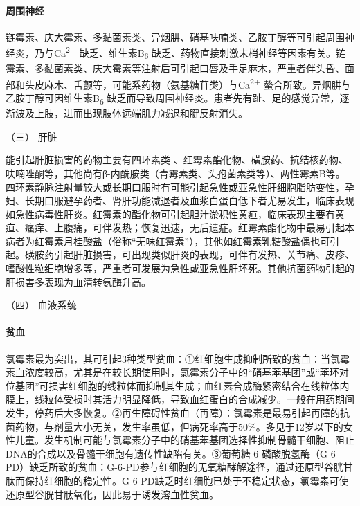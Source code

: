 \paragraph{周围神经}

链霉素、庆大霉素、多黏菌素类、异烟肼、硝基呋喃类、乙胺丁醇等可引起周围神经炎，乃与Ca\textsuperscript{2+}
缺乏、维生素B\textsubscript{6}
缺乏、药物直接刺激末梢神经等因素有关。链霉素、多黏菌素类、庆大霉素等注射后可引起口唇及手足麻木，严重者伴头昏、面部和头皮麻木、舌颤等，可能系药物（氨基糖苷类）与Ca\textsuperscript{2+}
螯合所致。异烟肼与乙胺丁醇可因维生素B\textsubscript{6}
缺乏而导致周围神经炎。患者先有趾、足的感觉异常，逐渐波及上肢，进而出现肢体远端肌力减退和腱反射消失。

\hypertarget{text00436.htmlux5cux23CHP17-7-7-1-3}{}
（三） 肝脏

能引起肝脏损害的药物主要有四环素类
、红霉素酯化物、磺胺药、抗结核药物、呋喃唑酮等，其他尚有β-内酰胺类（青霉素类、头孢菌素类等）、两性霉素B等。四环素静脉注射量较大或长期口服时有可能引起急性或亚急性肝细胞脂肪变性，孕妇、长期口服避孕药者、肾肝功能减退者及血浆白蛋白低下者尤易发生，临床表现如急性病毒性肝炎。红霉素的酯化物可引起胆汁淤积性黄疸，临床表现主要有黄疸、瘙痒、上腹痛，可伴发热；恢复迅速，无后遗症。红霉素酯化物中最易引起本病者为红霉素月桂酸盐（俗称“无味红霉素”），其他如红霉素乳糖酸盐偶也可引起。磺胺药引起肝脏损害，可出现类似肝炎的表现，可伴有发热、关节痛、皮疹、嗜酸性粒细胞增多等，严重者可发展为急性或亚急性肝坏死。其他抗菌药物引起的肝损害多表现为血清转氨酶升高。

\hypertarget{text00436.htmlux5cux23CHP17-7-7-1-4}{}
（四） 血液系统

\paragraph{贫血}

氯霉素最为突出，其可引起3种类型贫血：①红细胞生成抑制所致的贫血：当氯霉素血浓度较高，尤其是在较长期使用时，氯霉素分子中的“硝基苯基团”或“苯环对位基团”可损害红细胞的线粒体而抑制其生成；血红素合成酶紧密结合在线粒体内膜上，线粒体受损时其活力明显降低，导致血红蛋白的合成减少。一般在用药期间发生，停药后大多恢复。②再生障碍性贫血（再障）：氯霉素是最易引起再障的抗菌药物，与剂量大小无关，发生率虽低，但病死率高于50\%。多见于12岁以下的女性儿童。发生机制可能与氯霉素分子中的硝基苯基团选择性抑制骨髓干细胞、阻止DNA的合成以及骨髓干细胞有遗传性缺陷有关。③葡萄糖-6-磷酸脱氢酶（G-6-PD）缺乏所致的贫血：G-6-PD参与红细胞的无氧糖酵解途径，通过还原型谷胱甘肽而保持红细胞的稳定性。G-6-PD缺乏时红细胞已处于不稳定状态，氯霉素可使还原型谷胱甘肽氧化，因此易于诱发溶血性贫血。

